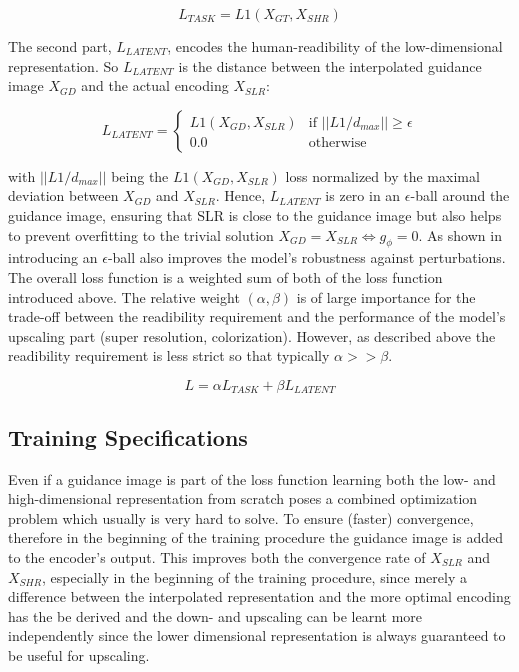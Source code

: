 $$L_{TASK} = L1(X_{GT}, X_{SHR})$$

The second part, $L_{LATENT}$, encodes the human-readibility of the low-dimensional
representation. So $L_{LATENT}$ is the distance between the interpolated guidance
image $X_{GD}$ and the actual encoding $X_{SLR}$:

$$L_{LATENT} = \begin{cases}
L1(X_{GD}, X_{SLR}) & \text{if } ||L1/d_{max}|| \geq \epsilon
\\ 0.0 & \text{otherwise}
\end{cases}$$

with $||L1/d_{max}||$ being the $L1(X_{GD}, X_{SLR})$ loss normalized
by the maximal deviation between $X_{GD}$ and $X_{SLR}$. Hence, $L_{LATENT}$
is zero in an $\epsilon$-ball around the guidance image, ensuring that \ac{SLR} is
close to the guidance image but also helps to prevent overfitting to the trivial
solution $X_{GD} = X_{SLR} \Leftrightarrow g_\phi = 0$. As shown in
 introducing an $\epsilon$-ball also improves
the model's robustness against perturbations.
\newline
The overall loss function is a weighted sum of both of the loss function
introduced above. The relative weight $(\alpha, \beta)$ is of large importance
for the trade-off between the readibility requirement and the performance of the
model's upscaling part (super resolution, colorization). However, as described
above the readibility requirement is less strict so that typically
$\alpha >> \beta$.

$$L = \alpha L_{TASK} + \beta L_{LATENT}$$

\subsection{Training Specifications}
\label{sec:Approach_TS}
Even if a guidance image is part of the loss function learning both the low-
and high-dimensional representation from scratch poses a combined optimization
problem which usually is very hard to solve. To ensure (faster) convergence,
therefore in the beginning of the training procedure the guidance image is
added to the encoder's output. This improves both the convergence rate of
$X_{SLR}$ and $X_{SHR}$, especially in the beginning of the training procedure,
since merely a difference between the interpolated representation and the more
optimal encoding has the be derived and the down- and upscaling can be learnt
more independently since the lower dimensional representation is always
guaranteed to be useful for upscaling.

